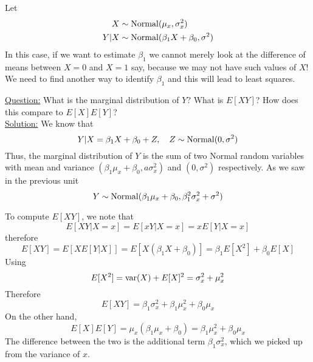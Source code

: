  
 \begin{example}\label{ex:firstreg}
Let
\begin{align*}
X &\sim {\rm Normal}(\mu_x,\sigma_x^2)\\
Y|X &\sim {\rm Normal}(\beta_1X + \beta_0,\sigma^2)
\end{align*}
In this case, if we want to estimate $\beta_1$ we cannot merely look at the difference of means between $X=0$ and $X=1$ say, because we may not have such values of $X$! We need to find another way to identify $\beta_1$ and this will lead to least squares. 


 \noindent
\underline{Question:} What is the marginal distribution of $Y$? What is $E[XY]$? How does this compare to $E[X]E[Y]$?\\


 \noindent
\underline{Solution:} We know that 
\begin{equation*}
Y|X =\beta_1X+\beta_0 + Z,\quad Z \sim {\rm Normal}(0,\sigma^2)
\end{equation*}
Thus, the marginal distribution of $Y$ is the sum of two Normal random variables with mean and variance $(\beta_1\mu_x+\beta_0,a\sigma_x^2)$ and $(0,\sigma^2)$ respectively. As we saw in the previous unit
\begin{equation*}
Y  \sim {\rm Normal}(\beta_1\mu_x+\beta_0,\beta_1^2\sigma_x^2 + \sigma^2)
\end{equation*}

To compute $E[XY]$, we note that 
\begin{equation*}
E[XY|X=x]=  E[xY|X=x]= xE[Y|X=x]
\end{equation*}
therefore
\begin{equation*}
E[XY] = E[XE[Y|X]] = E[X(\beta_1X+\beta_0)] = \beta_1E[X^2]+\beta_0E[X]
\end{equation*}
Using 
\begin{equation*}
E[X^2] = {\rm var}(X) + E[X]^2 = \sigma_x^2 + \mu_x^2
\end{equation*}
Therefore 
\begin{equation*}
E[XY] =  \beta_1\sigma_x^2 + \beta_1\mu_x^2 + \beta_0\mu_x
\end{equation*}
On the other hand, 
\begin{equation*}
E[X]E[Y] = \mu_x(\beta_1\mu_x+\beta_0) = \beta_1 \mu_x^2 +\beta_0 \mu_x
\end{equation*}
The difference between the two is the additional term $\beta_1\sigma_x^2$, which we picked up from the variance of $x$.  

\end{example}

